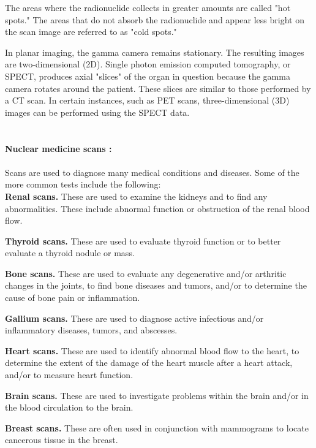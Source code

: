 \documentclass[12pt]{article}
\begin{document}
\noindent The areas where the radionuclide collects in greater amounts are called "hot spots." The areas that do not absorb the radionuclide and appear less bright on the scan image are referred to as "cold spots."

\noindent In planar imaging, the gamma camera remains stationary. The resulting images are two-dimensional (2D). Single photon emission computed tomography, or SPECT, produces axial "slices" of the organ in question because the gamma camera rotates around the patient. These slices are similar to those performed by a CT scan. In certain instances, such as PET scans, three-dimensional (3D) images can be performed using the SPECT data.\\

\\ \\\noindent  \textbf{\large  Nuclear medicine scans :} \\ \\ Scans are used to diagnose many medical conditions and diseases. Some of the more common tests include the following:\\

\noindent \textbf{\large  Renal scans.} These are used to examine the kidneys and to find any abnormalities. These include abnormal function or obstruction of the renal blood flow.

\noindent \textbf{\large Thyroid scans.} These are used to evaluate thyroid function or to better evaluate a thyroid nodule or mass.

\noindent \textbf{\large Bone scans.} These are used to evaluate any degenerative and/or arthritic changes in the joints, to find bone diseases and tumors, and/or to determine the cause of bone pain or inflammation.

\noindent \textbf{\large Gallium scans.} These are used to diagnose active infectious and/or inflammatory diseases, tumors, and abscesses.

\noindent \textbf{\large Heart scans.} These are used to identify abnormal blood flow to the heart, to determine the extent of the damage of the heart muscle after a heart attack, and/or to measure heart function.

\noindent \textbf{\large Brain scans.} These are used to investigate problems within the brain and/or in the blood circulation to the brain.

\noindent \textbf{\large Breast scans.} These are often used in conjunction with mammograms to locate cancerous tissue in the breast.\\
\end{document}
